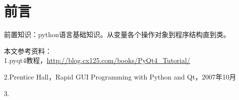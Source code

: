 \documentclass[12pt,oneside]{book}
\begin{document}
\frontmatter

\author{万泽}
\titleLA

\chapter*{前言}
\begin{common-format}
前置知识：python语言基础知识。从变量各个操作对象到程序结构直到类。


本文参考资料：\\
1.pyqt4教程，\href{http://blog.cx125.com/books/PyQt4_Tutorial/}{http://blog.cx125.com/books/PyQt4\_{}Tutorial/}

2.Prentice Hall，Rapid GUI Programming with Python and Qt，2007年10月

3.



\end{common-format}


\setcounter{tocdepth}{2}
\tableofcontents
\end{document}
